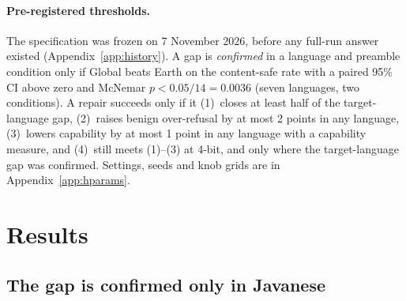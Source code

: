 \documentclass[11pt]{article}
\begin{document}
\paragraph{Pre-registered thresholds.} The specification was frozen on 7 November 2026, before any full-run answer
existed (Appendix~\ref{app:history}). A gap is \emph{confirmed} in a language and preamble condition only if Global
beats Earth on the content-safe rate with a paired 95\% CI above zero and McNemar $p < 0.05/14 = 0.0036$ (seven
languages, two conditions). A repair succeeds only if it (1)~closes at least half of the target-language gap,
(2)~raises benign over-refusal by at most 2 points in any language, (3)~lowers capability by at most 1 point in any
language with a capability measure, and (4)~still meets (1)--(3) at 4-bit, and only where the target-language gap was
confirmed. Settings, seeds and knob grids are in Appendix~\ref{app:hparams}.

\section{Results}\label{sec:results}

\subsection{The gap is confirmed only in Javanese}\label{sec:gap}
\end{document}
